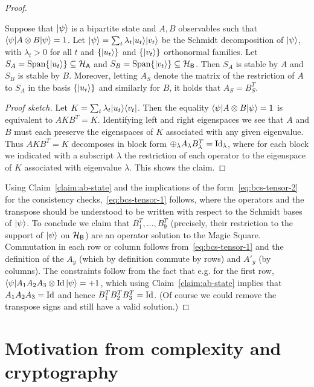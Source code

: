 \begin{proof}
\begin{claim}\label{claim:ab-state}
Suppose that $|\psi\rangle$ is a bipartite state and $A,B$ observables such that $\langle\psi| A\otimes B |\psi\rangle = 1$. Let $|\psi\rangle = \sum_t \lambda_t |u_t\rangle |v_t\rangle$ be the Schmidt decomposition of $|\psi\rangle$, with $\lambda_t>0$ for all $t$ and $\{|u_t\rangle\}$ and $\{|v_t\rangle\}$ orthonormal families. Let  $S_A = \text{Span}\{|u_t\rangle\} \subseteq \mathcal{H}_{\textsf{A}}$ and $S_B=\text{Span}\{|v_t\rangle\} \subseteq \mathcal{H}_{\textsf{B}}$. Then $S_A$ is stable by $A$ and $S_B$ is stable by $B$. Moreover, letting $A_S$ denote the matrix of the restriction of $A$ to $S_A$ in the basis $\{|u_t\rangle\}$ and similarly for $B$, it holds that    $A_S=B_S^T$. 
\end{claim}

\begin{proof}[Proof sketch]
Let $K = \sum_t \lambda_t |u_t\rangle\langle v_t|$. Then the equality $\langle\psi| A\otimes B |\psi\rangle = 1$ is equivalent to $AKB^T = K$. Identifying left and right eigenspaces we see that $A$ and $B$ must each preserve the eigenspaces of $K$ associated with any given eigenvalue. Thus $AKB^T = K$ decomposes in block form $\oplus_\lambda  A_\lambda B_\lambda^T = \mathop{\rm Id}\nolimits_\lambda$, where for each block we indicated with a subscript $\lambda$ the restriction of each operator to the eigenspace of $K$ associated with eigenvalue $\lambda$. This shows the claim.  
\end{proof}

Using Claim~\ref{claim:ab-state} and the implications of the form~\eqref{eq:bcs-tensor-2} for the consistency checks,~\eqref{eq:bcs-tensor-1} follows, where the operators and the transpose should be understood to be written with respect to the Schmidt bases of $|\psi\rangle$. To conclude we claim that $B_1^T,\ldots,B_9^T$ (precisely, their restriction to the support of $|\psi\rangle$ on $\mathcal{H}_{\textsf{B}}$) are an operator solution to the Magic Square. Commutation in each row or column follows from~\eqref{eq:bcs-tensor-1} and the definition of the $A_y$ (which by definition commute by rows) and $A'_y$ (by columns). The constraints follow from the fact that e.g. for the first row, $\langle\psi| A_1 A_2 A_3 \otimes \mathop{\rm Id}\nolimits|\psi\rangle = +1$, which using Claim~\ref{claim:ab-state}  implies that $A_1A_2A_3 = \mathop{\rm Id}\nolimits$ and hence $B_1^T B_2^T B_3^T = \mathop{\rm Id}\nolimits$. (Of course we could remove the transpose signs and still have a valid solution.)
\end{proof}



\section{Motivation from complexity and cryptography}


